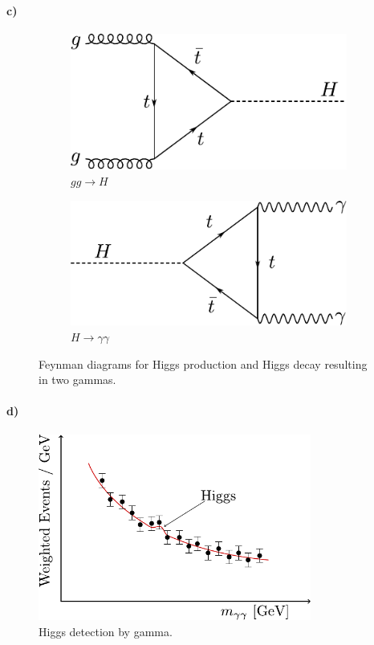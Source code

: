 \paragraph{c)}
\begin{figure}[H]
	\centering
	\begin{subfigure}{0.49\textwidth}
		\includegraphics[width=\textwidth]{figures/gg_higgs.pdf}
		\caption{$g g \to H$}
	\end{subfigure}
	\hfill
	\begin{subfigure}{0.49\textwidth}
		\includegraphics[width=\textwidth]{figures/Higgs_yy.pdf}
		\caption{$H \to \gamma \gamma$}
	\end{subfigure}
	\caption{Feynman diagrams for Higgs production and Higgs decay resulting in two gammas.}
\end{figure}
\paragraph{d)}

\begin{figure}
	\centering
	\includegraphics[width=0.8\textwidth]{figures/Higgs_detection.pdf}
	\caption{Higgs detection by gamma.}
\end{figure}


